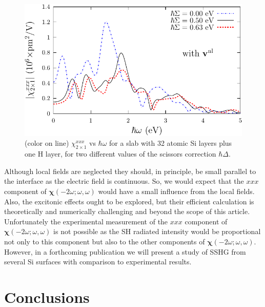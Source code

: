 \documentclass[floatfix,prb,aps,superscriptaddress,showpacs,11pt,preprint,letterpaper]{revtex4}
\begin{document}
\begin{figure}
\centering 
\includegraphics[scale=.8]{plots/fig4}
\caption{(color on line) 
$\chi^{xxx}_{2\times 1}$
vs $\hbar\omega$ for a slab with 32 
atomic Si layers plus one H layer, 
for two different values of 
the scissors correction $\hbar\Delta$. 
\label{fig4}} 
\end{figure}

Although local fields are neglected they should, in principle, 
be small parallel to the interface as the electric field is continuous.
So, we would expect that the $xxx$ component of 
$\boldsymbol{\chi}(-2\omega;\omega,\omega)$ 
would have a small influence from the local fields.
Also, the excitonic effects ought to be explored, but
their efficient calculation is theoretically and 
numerically challenging\cite{beyond}   and beyond the scope 
of this article.
Unfortunately the experimental measurement of the $xxx$
component of $\boldsymbol{\chi}(-2\omega;\omega,\omega)$ is not possible as the SH 
radiated intensity would be proportional not only to this component 
but also to the other components of $\boldsymbol{\chi}(-2\omega;\omega,\omega)$.  
However,
in a forthcoming publication 
we will present a study of SSHG from several 
Si surfaces 
with comparison to experimental 
results. 

\section{Conclusions}\label{conc}
\end{document}
